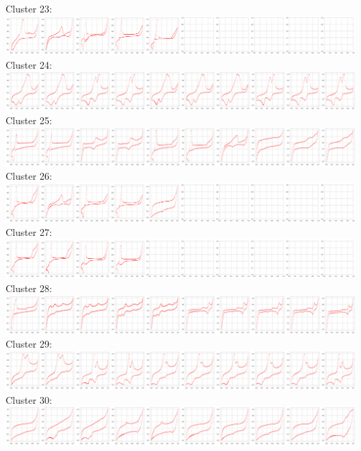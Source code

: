 Cluster 23:\\
\includegraphics[width=1.0\textwidth]{figures/clusters/cv_cluster23.png}
Cluster 24:\\
\includegraphics[width=1.0\textwidth]{figures/clusters/cv_cluster24.png}
Cluster 25:\\
\includegraphics[width=1.0\textwidth]{figures/clusters/cv_cluster25.png}
Cluster 26:\\
\includegraphics[width=1.0\textwidth]{figures/clusters/cv_cluster26.png}
Cluster 27:\\
\includegraphics[width=1.0\textwidth]{figures/clusters/cv_cluster27.png}
Cluster 28:\\
\includegraphics[width=1.0\textwidth]{figures/clusters/cv_cluster28.png}
Cluster 29:\\
\includegraphics[width=1.0\textwidth]{figures/clusters/cv_cluster29.png}
Cluster 30:\\
\includegraphics[width=1.0\textwidth]{figures/clusters/cv_cluster30.png}
